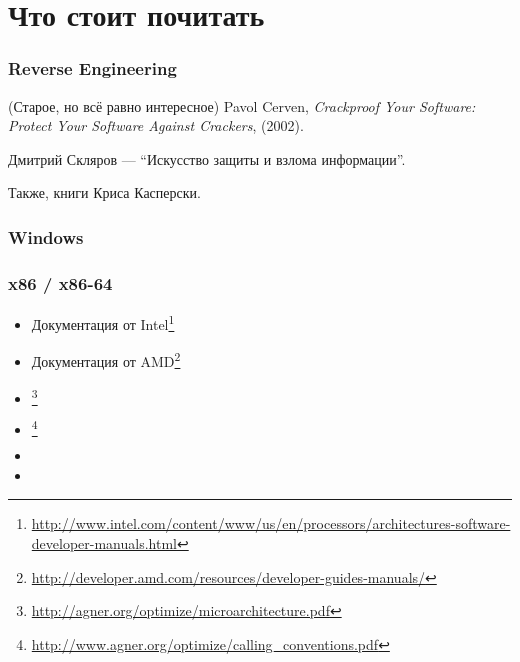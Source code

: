 \chapter{Что стоит почитать}


\subsection{Reverse Engineering}



(Старое, но всё равно интересное) Pavol Cerven, \emph{Crackproof Your Software: Protect Your Software Against Crackers}, (2002).

Дмитрий Скляров --- ``Искусство защиты и взлома информации''.

Также, книги Криса Касперски.

\subsection{Windows}



\subsection{\CCpp}



\subsection{x86 / x86-64}

\label{x86_manuals}
\begin{itemize}
\item Документация от Intel\footnote{\AlsoAvailableAs \url{http://www.intel.com/content/www/us/en/processors/architectures-software-developer-manuals.html}}

\item Документация от AMD\footnote{\AlsoAvailableAs \url{http://developer.amd.com/resources/developer-guides-manuals/}}

\item \AgnerFog{}\footnote{\AlsoAvailableAs \url{http://agner.org/optimize/microarchitecture.pdf}}

\item \AgnerFogCC{}\footnote{\AlsoAvailableAs \url{http://www.agner.org/optimize/calling_conventions.pdf}}

\item \IntelOptimization

\item \AMDOptimization
\end{itemize}

